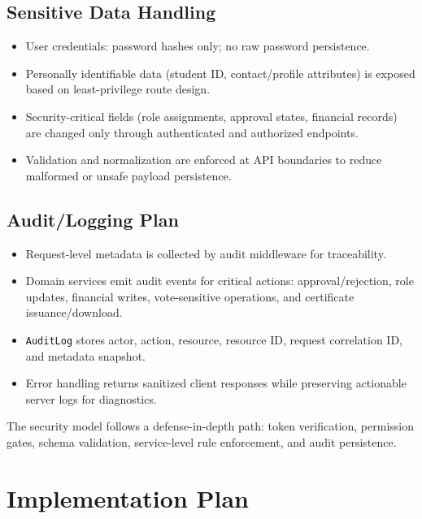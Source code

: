 \documentclass[12pt,a4paper]{article}
\begin{document}
\subsection{Sensitive Data Handling}

\begin{itemize}[noitemsep]
  \item User credentials: password hashes only; no raw password persistence.
  \item Personally identifiable data (student ID, contact/profile attributes) is exposed based on least-privilege route design.
  \item Security-critical fields (role assignments, approval states, financial records) are changed only through authenticated and authorized endpoints.
  \item Validation and normalization are enforced at API boundaries to reduce malformed or unsafe payload persistence.
\end{itemize}

\subsection{Audit/Logging Plan}

\begin{itemize}[noitemsep]
  \item Request-level metadata is collected by audit middleware for traceability.
  \item Domain services emit audit events for critical actions: approval/rejection, role updates, financial writes, vote-sensitive operations, and certificate issuance/download.
  \item \texttt{AuditLog} stores actor, action, resource, resource ID, request correlation ID, and metadata snapshot.
  \item Error handling returns sanitized client responses while preserving actionable server logs for diagnostics.
\end{itemize}

\begin{tcolorbox}[significancestyle]
The security model follows a defense-in-depth path: token verification, permission gates, schema validation, service-level rule enforcement, and audit persistence.
\end{tcolorbox}

\section{Implementation Plan}
\end{document}
